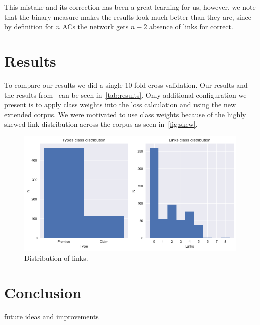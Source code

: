 \documentclass[onecolumn]{article}
\begin{document}
This mistake and its correction has been a great learning for us, however, we note that the binary measure makes the results look much better than they are,
since by definition for $n$ ACs the network gets $n-2$ absence of links for correct.

\section{Results}
To compare our results we did a single 10-fold cross validation. Our results and the results from~\cite{potash2017here} can be seen in~\autoref{tab:results}.
Only additional configuration we present is to apply class weights into the loss calculation and using the new extended corpus.
We were motivated to use class weights because of the highly skewed link distribution across the corpus as seen in~\autoref{fig:skew}.

\begin{figure}[h]
    \centering
    \includegraphics[width=0.4\linewidth]{fig/dist.png}
    \caption{Distribution of links.}\label{fig:skew}
\end{figure}

\section{Conclusion}
future ideas and improvements

\nocite{*}


\end{document}
